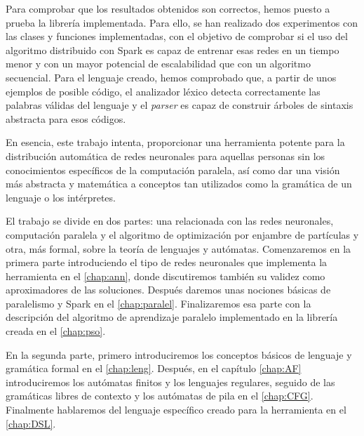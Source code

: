 \vspace{10pt}
Para comprobar que los resultados obtenidos son correctos, hemos puesto a prueba la librería implementada. Para ello,
se han realizado dos experimentos con las clases y funciones implementadas, con el objetivo de comprobar si el uso del
algoritmo distribuido con Spark es capaz de entrenar esas redes en un tiempo menor y con un mayor potencial de 
escalabilidad que con un algoritmo secuencial. Para el lenguaje creado, hemos comprobado que, a partir de unos ejemplos 
de posible código, el analizador léxico detecta correctamente las palabras válidas del lenguaje y el \textit{parser} es 
capaz de construir árboles de sintaxis abstracta para esos códigos.

\vspace{10pt}
En esencia, este trabajo intenta, proporcionar una herramienta potente para la distribución automática de redes 
neuronales para aquellas personas sin los conocimientos específicos de la computación paralela, así como dar una visión 
más abstracta y matemática a conceptos tan utilizados como la gramática de un lenguaje o los intérpretes.

\vspace{10pt}
El trabajo se divide en dos partes: una relacionada con las redes neuronales, computación paralela y el algoritmo de 
optimización por enjambre de partículas y otra, más formal, sobre la teoría de lenguajes y autómatas. Comenzaremos en 
la primera parte introduciendo el tipo de redes neuronales que implementa la herramienta en el \autoref{chap:ann}, 
donde discutiremos también su validez como aproximadores de las soluciones. Después daremos unas nociones básicas de 
paralelismo y Spark en el \autoref{chap:paralel}. Finalizaremos esa parte con la descripción del algoritmo de 
aprendizaje paralelo implementado en la librería creada en el \autoref{chap:pso}.

\vspace{10pt}
En la segunda parte, primero introduciremos los conceptos básicos de lenguaje y gramática formal en el 
\autoref{chap:leng}. Después, en el capítulo \autoref{chap:AF} introduciremos los autómatas finitos y los lenguajes
regulares, seguido de las gramáticas libres de contexto y los autómatas de pila en el \autoref{chap:CFG}. Finalmente
hablaremos del lenguaje específico creado para la herramienta en el \autoref{chap:DSL}.



\endinput
